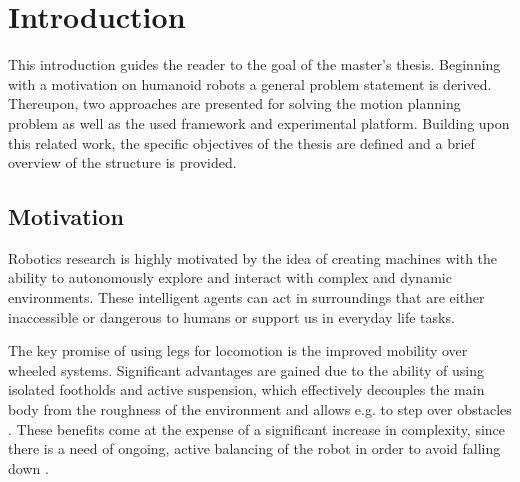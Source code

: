 
\chapter{Introduction}\label{c1}
This introduction guides the reader to the goal of the master's thesis. Beginning with a motivation on humanoid robots a general problem statement is derived. Thereupon, two approaches are presented for solving the motion planning problem as well as the used framework and experimental platform. Building upon this related work, the specific objectives of the thesis are defined and a brief overview of the structure is provided.

\section{Motivation}
Robotics research is highly motivated by the idea of creating machines with the ability to autonomously explore and interact with complex and dynamic environments. These intelligent agents can act in surroundings that are either inaccessible or dangerous to humans or support us in everyday life tasks. 
 
The key promise of using legs for locomotion is the improved mobility over wheeled systems. Significant advantages are gained due to the ability of using isolated footholds and active suspension, which effectively decouples the main body from the roughness of the environment and allows e.g. to step over obstacles \cite{raibert1986legged}. These benefits come at the expense of a significant increase in complexity, since there is a need of ongoing, active balancing of the robot in order to avoid falling down \cite{wieber2016modeling}.

